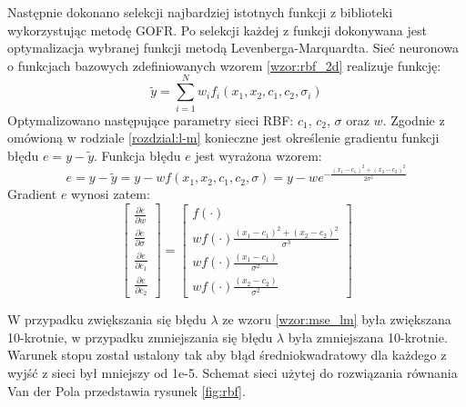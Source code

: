 Następnie dokonano selekcji najbardziej istotnych funkcji z biblioteki wykorzystując metodę GOFR. Po selekcji każdej z funkcji dokonywana jest optymalizacja wybranej funkcji metodą Levenberga-Marquardta. Sieć neuronowa o funkcjach bazowych zdefiniowanych wzorem \ref{wzor:rbf_2d} realizuje funkcję:
\begin{equation}
	\tilde{y} = \sum_{i=1}^N w_i f_i(x_1,x_2,c_1,c_2,\sigma_i)
\end{equation}
Optymalizowano następujące parametry sieci RBF: $c_1$, $c_2$, $\sigma$ oraz $w$. Zgodnie z omówioną w rodziale \ref{rozdzial:l-m} konieczne jest określenie gradientu funkcji błędu $e = y - \tilde{y}$. Funkcja błędu $e$ jest wyrażona wzorem:
\begin{equation}
	e = y - \tilde{y} = y - w f(x_1,x_2,c_1,c_2,\sigma) = y - w e^{-\frac{(x_1-c_1)^2 + (x_2-c_2)^2}{2 \sigma^2}} 
\end{equation}
Gradient $e$ wynosi zatem:
\begin{equation}
\begin{bmatrix}
	\frac{\partial e}{\partial w} \\
	\frac{\partial e}{\partial \sigma} \\
	\frac{\partial e}{\partial c_1} \\
	\frac{\partial e}{\partial c_2}
\end{bmatrix} = 
\begin{bmatrix}
	f(\cdot) \\
	w f(\cdot) \frac{(x_1 - c_1)^2 + (x_2 - c_2)^2}{\sigma^3}\\
	w f(\cdot) \frac{(x_1 - c_1)}{\sigma^2}\\
	w f(\cdot) \frac{(x_2 - c_2)}{\sigma^2}	
\end{bmatrix}
\end{equation}

W przypadku zwiększania się błędu $\lambda$ ze wzoru \ref{wzor:mse_lm} była zwiększana 10-krotnie, w przypadku zmniejszania się błędu $\lambda$ była zmniejszana 10-krotnie. Warunek stopu został ustalony tak aby błąd średniokwadratowy dla każdego z wyjść z sieci był mniejszy od 1e-5. Schemat sieci użytej do rozwiązania równania Van der Pola przedstawia rysunek \ref{fig:rbf}.

